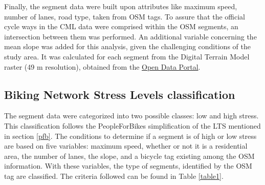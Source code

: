 \documentclass[information,article,submit,moreauthors,pdftex,10pt,a4paper]{mdpi}
\theoremstyle{mdpi}
\newcounter{ex}
\newcounter{re}
\theoremstyle{mdpidefinition}
\begin{document}
Finally, the segment data were built upon attributes like maximum speed, number of lanes, road type, taken from OSM tags. To assure that the official cycle ways in the CML data were comprised within the OSM segments, an intersection between them was performed. An additional variable concerning the mean slope was added for this analysis, given the challenging conditions of the study area. It was calculated for each segment from the Digital Terrain Model raster (49 m resolution), obtained from the \href{http://dados.cm-lisboa.pt}{Open Data Portal}. 

\subsection{Biking Network Stress Levels classification} \label{classification}

The segment data were categorized into two possible classes: low and high stress. This classification follows the PeopleForBikes simplification of the LTS mentioned in section \ref{pfb}. The conditions to determine if a segment is of high or low stress are based on five variables: maximum speed, whether or not it is a residential area, the number of lanes, the slope, and a bicycle tag existing among the OSM information. With these variables, the type of segments, identified by the OSM tag are classified. The criteria followed can be found in Table \ref{table1}.
\end{document}
